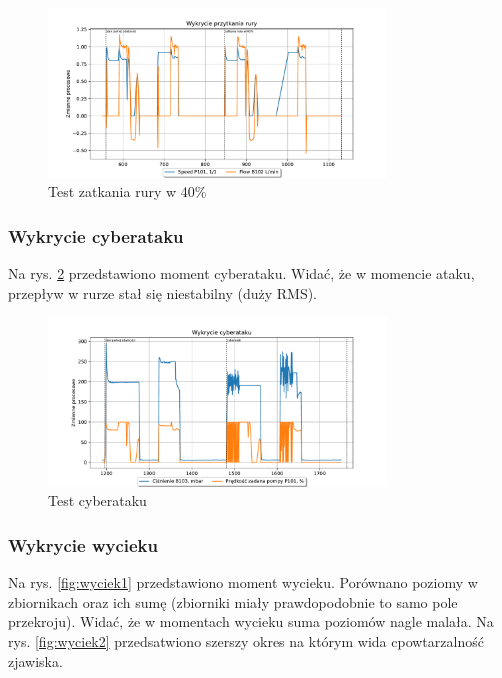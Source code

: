 \documentclass[a4paper,12pt]{article}
\begin{document}
\begin{figure}[H]
        \centering
        \includegraphics[width=0.8\textwidth]{clogging_detection_550_1130}
        \caption{Test zatkania rury w 40\%}
        \label{fig:zatkanie2}
\end{figure}


\subsubsection{Wykrycie cyberataku}
Na rys. \ref{fig:atak} przedstawiono moment cyberataku. Widać, że w momencie ataku, przepływ w rurze stał się niestabilny (duży RMS).

\begin{figure}[H]
        \centering
        \includegraphics[width=0.8\textwidth]{attack_detection_1190_1750.pdf}
        \caption{Test cyberataku}
        \label{fig:atak}
\end{figure}

\subsubsection{Wykrycie wycieku}

Na rys. \ref{fig:wyciek1} przedstawiono moment wycieku. Porównano poziomy w zbiornikach oraz ich sumę (zbiorniki miały prawdopodobnie to samo pole przekroju). Widać, że w momentach wycieku suma poziomów nagle malała. Na rys. \ref{fig:wyciek2} przedsatwiono szerszy okres na którym wida cpowtarzalność zjawiska.
\end{document}
